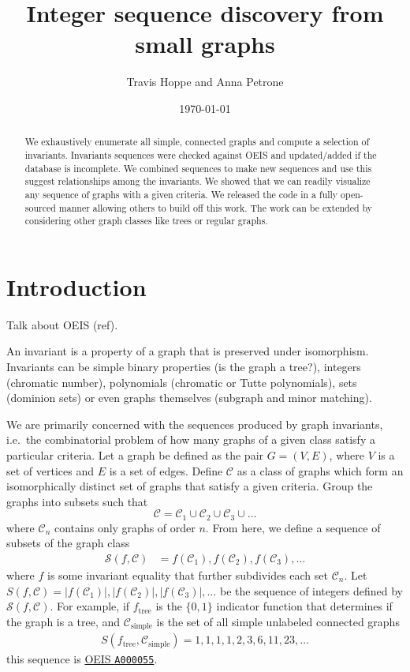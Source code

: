\documentclass[12pt]{article}
\newcommand{\OEIS}[1]
{\href{https://oeis.org/#1}{OEIS \texttt{#1}}}
\newcommand{\ie}[0]{i.e.\ }
\begin{document}
\title{Integer sequence discovery from small graphs}
\author{Travis Hoppe and Anna Petrone}
\date{\today}
\maketitle

\begin{abstract}
We exhaustively enumerate all simple, connected graphs and compute a selection of invariants. 
Invariants sequences were checked against OEIS and updated/added if the database is incomplete.
We combined sequences to make new sequences and use this suggest relationships among the invariants.
We showed that we can readily visualize any sequence of graphs with a given criteria.
We released the code in a fully open-sourced manner allowing others to build off this work.
The work can be extended by considering other graph classes like trees or regular graphs.
\end{abstract}

\section{Introduction}

Talk about OEIS (ref).

An invariant is a property of a graph that is preserved under isomorphism. 
Invariants can be simple binary properties (is the graph a tree?), integers (chromatic number), polynomials (chromatic or Tutte polynomials), sets (dominion sets) or even graphs themselves (subgraph and minor matching).

We are primarily concerned with the sequences produced by graph invariants, \ie the combinatorial problem of how many graphs of a given class satisfy a particular criteria.
Let a graph be defined as the pair $G = (V,E)$, where $V$ is a set of vertices and $E$ is a set of edges. 
Define $\mathcal{C}$ as a class of graphs which form an isomorphically distinct set of graphs that satisfy a given criteria.
Group the graphs into subsets such that
\begin{equation}
\mathcal{C} = \mathcal{C}_1 \cup \mathcal{C}_2 \cup \mathcal{C}_3 \cup \ldots
\end{equation}
where $\mathcal{C}_n$ contains only graphs of order $n$.
From here, we define a sequence of subsets of the graph class
%
\begin{align}
\mathcal{S}(f, \mathcal{C}) 
&= f(\mathcal{C}_1), f(\mathcal{C}_2), f(\mathcal{C}_3), \ldots 
\end{align}
%
where $f$ is some invariant equality that further subdivides each set $\mathcal{C}_n$. 
Let 
$S(f, \mathcal{C}) = |f(\mathcal{C}_1)|, |f(\mathcal{C}_2)|, |f(\mathcal{C}_3)|, \ldots$
be the sequence of integers defined by $\mathcal{S}(f, \mathcal{C})$.
For example, if $f_\text{tree}$ is the $\{0,1\}$ indicator function that determines if the graph is a tree, and $\mathcal{C}_\text{simple}$ is the set of all simple unlabeled connected graphs
%
\begin{align}
S(f_\text{tree}, \mathcal{C}_\text{simple}) = 1, 1, 1, 1, 2, 3, 6, 11, 23, \ldots
\end{align}
%
this sequence is \OEIS{A000055}.
\end{document}
